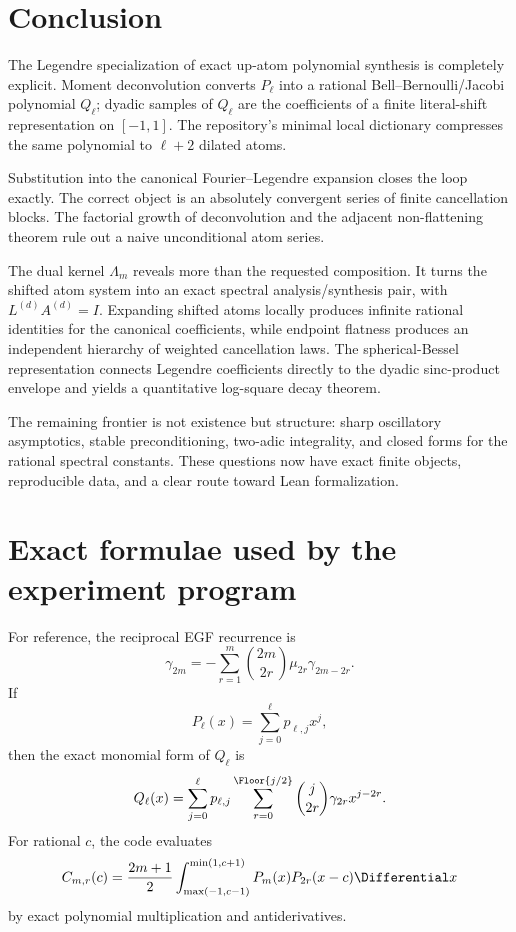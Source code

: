 \documentclass[11pt,oneside]{article}
\numberwithin{equation}{section}
\theoremstyle{definition}
\theoremstyle{remark}
\begin{document}
\section{Conclusion}
\label{sec:conclusion}

The Legendre specialization of exact up-atom polynomial synthesis is completely
explicit.  Moment deconvolution converts $P_\ell$ into a rational
Bell--Bernoulli/Jacobi polynomial $Q_\ell$; dyadic samples of $Q_\ell$ are the
coefficients of a finite literal-shift representation on $[-1,1]$.  The
repository's minimal local dictionary compresses the same polynomial to
$\ell+2$ dilated atoms.

Substitution into the canonical Fourier--Legendre expansion closes the loop
exactly.  The correct object is an absolutely convergent series of finite
cancellation blocks.  The factorial growth of deconvolution and the adjacent
non-flattening theorem rule out a naive unconditional atom series.

The dual kernel $\Lambda_m$ reveals more than the requested composition.  It
turns the shifted atom system into an exact spectral analysis/synthesis pair,
with $L^{(d)}A^{(d)}=I$.  Expanding shifted atoms locally produces infinite
rational identities for the canonical coefficients, while endpoint flatness
produces an independent hierarchy of weighted cancellation laws.  The
spherical-Bessel representation connects Legendre coefficients directly to
the dyadic sinc-product envelope and yields a quantitative log-square decay
theorem.

The remaining frontier is not existence but structure: sharp oscillatory
asymptotics, stable preconditioning, two-adic integrality, and closed forms for
the rational spectral constants.  These questions now have exact finite
objects, reproducible data, and a clear route toward Lean formalization.

\appendix

\section{Exact formulae used by the experiment program}
\label{app:formulae}

For reference, the reciprocal EGF recurrence is
\begin{equation}
 \gamma_{2m}=-\sum_{r=1}^{m}\binom{2m}{2r}
 \mu_{2r}\gamma_{2m-2r}.
 \label{eq:gamma-recurrence}
\end{equation}
If
\[
 P_\ell(x)=\sum_{j=0}^{\ell}p_{\ell,j}x^j,
\]
then the exact monomial form of $Q_\ell$ is
\begin{equation}
 Q_\ell(x)=\sum_{j=0}^{\ell}p_{\ell,j}
 \sum_{r=0}^{\Floor{j/2}}
 \binom{j}{2r}\gamma_{2r}x^{j-2r}.
 \label{eq:Q-monomial}
\end{equation}
For rational $c$, the code evaluates
\begin{equation}
 C_{m,r}(c)=\frac{2m+1}{2}
 \int_{\max(-1,c-1)}^{\min(1,c+1)}
 P_m(x)P_{2r}(x-c)\Differential x
 \label{eq:C-code}
\end{equation}
by exact polynomial multiplication and antiderivatives.
\end{document}
